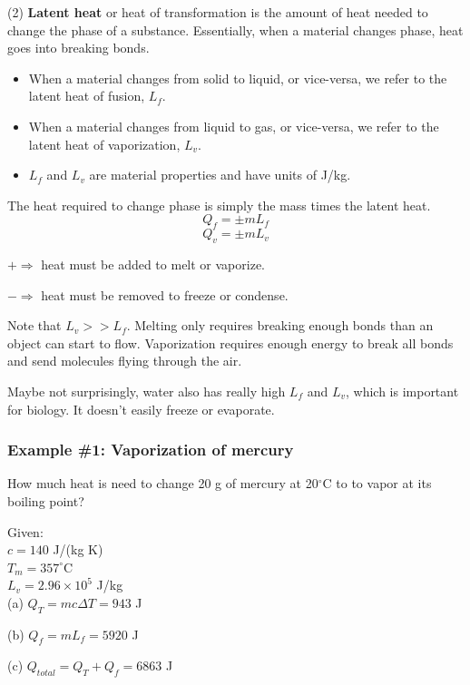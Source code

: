 (2) \textbf{Latent heat} or heat of transformation is the amount of heat needed to change the phase of a substance. Essentially, when a material changes phase, heat goes into breaking bonds.

\begin{itemize}
\item When a material changes from solid to liquid, or vice-versa, we refer to the latent heat of fusion, $L_f$.
\item When a material changes from liquid to gas, or vice-versa, we refer to the latent heat of vaporization, $L_v$.
\item $L_f$ and $L_v$ are material properties and have units of J/kg.
\end{itemize}

The heat required to change phase is simply the mass times the latent heat.
$$\boxed{Q_f=\pm mL_f}$$
$$\boxed{Q_v=\pm mL_v}$$

$+\Rightarrow$ heat must be added to melt or vaporize.

$-\Rightarrow$ heat must be removed to freeze or condense.

Note that $L_v>>L_f$. Melting only requires breaking enough bonds than an object can start to flow. Vaporization requires enough energy to break all bonds and send molecules flying through the air.

Maybe not surprisingly, water also has really high $L_f$ and $L_v$, which is important for biology. It doesn't easily freeze or evaporate.

\subsubsection{Example \#1: Vaporization of mercury}
How much heat is need to change 20 g of mercury at 20$^\circ$C to to vapor at its boiling point?

Given:\\
$c=140$ J/(kg K)\\
$T_m=357^\circ$C\\
$L_v=2.96\times 10^5$ J/kg\\

(a) $Q_T=mc\Delta{T}=943$ J

(b) $Q_f=mL_f=5920$ J

(c) $Q_{total}=Q_T+Q_f=6863$ J

\clearpage
